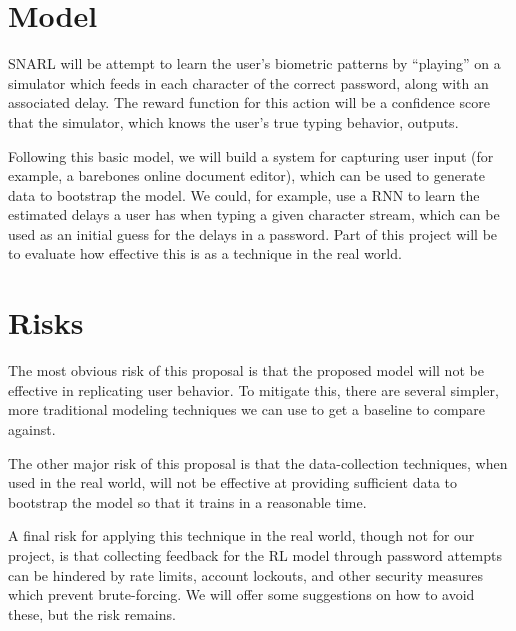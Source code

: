 \documentclass[preprint,12pt]{elsarticle}
\begin{document}
\section{Model}

SNARL will be attempt to learn the user's biometric patterns by ``playing'' on a simulator which feeds in each character of the correct password, along with an associated delay. The reward function for this action will be a confidence score that the simulator, which knows the user's true typing behavior, outputs.

Following this basic model, we will build a system for capturing user input (for example, a barebones online document editor), which can be used to generate data to bootstrap the model. We could, for example, use a RNN to learn the estimated delays a user has when typing a given character stream, which can be used as an initial guess for the delays in a password. Part of this project will be to evaluate how effective this is as a technique in the real world.

\section{Risks}

The most obvious risk of this proposal is that the proposed model will not be effective in replicating user behavior. To mitigate this, there are several simpler, more traditional modeling techniques we can use to get a baseline to compare against.

The other major risk of this proposal is that the data-collection techniques, when used in the real world, will not be effective at providing sufficient data to bootstrap the model so that it trains in a reasonable time.

A final risk for applying this technique in the real world, though not for our project, is that collecting feedback for the RL model through password attempts can be hindered by rate limits, account lockouts, and other security measures which prevent brute-forcing. We will offer some suggestions on how to avoid these, but the risk remains.
\end{document}
